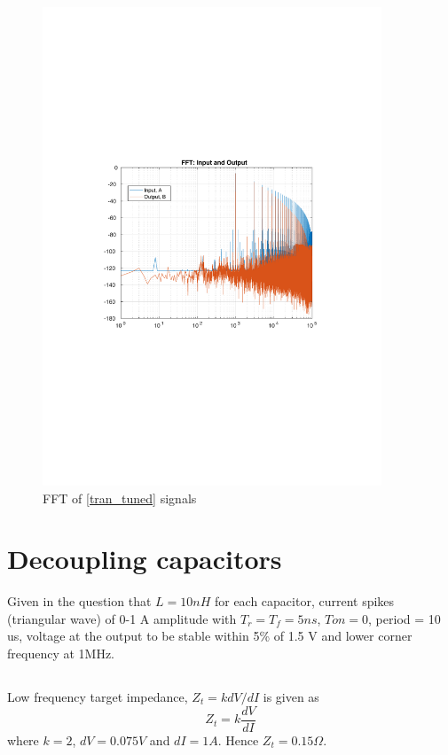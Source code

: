 \documentclass[12pt,a4paper,UKenglish]{article}
\begin{document}
\begin{figure} [H]
  \centering 
  \includegraphics[width=0.9\textwidth]{img/2c_fft.pdf} 
  \caption{FFT of \ref{tran_tuned} signals}
  \label{fft_tuned} 
\end{figure}

\section{Decoupling capacitors}
Given in the question that $L = 10 nH$ for each capacitor, current spikes (triangular wave) of 0-1 A amplitude with $T_r = T_f = 5 ns$, $Ton = 0$, period = 10 us, voltage at the output to be stable within 5\% of 1.5 V and lower corner frequency at 1MHz. 
\subsection{}
Low frequency target impedance, $Z_t= k dV/dI$ is given as
\begin{equation*}
Z_t= k \frac{dV}{dI}
\end{equation*}
 where $k = 2$, $dV = 0.075 V$ and $dI = 1 A$. Hence $Z_t = 0.15 \Omega$.
\end{document}
